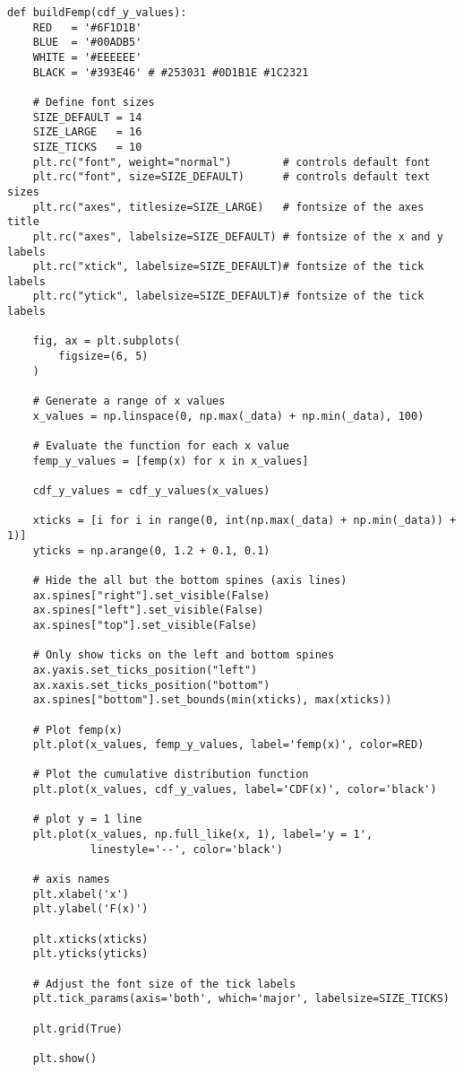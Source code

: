 \documentclass[a4paper, 14pt]{extarticle}
\begin{document}
\begin{lstlisting}
def buildFemp(cdf_y_values):
    RED   = '#6F1D1B'
    BLUE  = '#00ADB5'
    WHITE = '#EEEEEE'
    BLACK = '#393E46' # #253031 #0D1B1E #1C2321

    # Define font sizes
    SIZE_DEFAULT = 14
    SIZE_LARGE   = 16
    SIZE_TICKS   = 10
    plt.rc("font", weight="normal")        # controls default font
    plt.rc("font", size=SIZE_DEFAULT)      # controls default text sizes
    plt.rc("axes", titlesize=SIZE_LARGE)   # fontsize of the axes title
    plt.rc("axes", labelsize=SIZE_DEFAULT) # fontsize of the x and y labels
    plt.rc("xtick", labelsize=SIZE_DEFAULT)# fontsize of the tick labels
    plt.rc("ytick", labelsize=SIZE_DEFAULT)# fontsize of the tick labels

    fig, ax = plt.subplots(
        figsize=(6, 5)
    )

    # Generate a range of x values
    x_values = np.linspace(0, np.max(_data) + np.min(_data), 100)

    # Evaluate the function for each x value
    femp_y_values = [femp(x) for x in x_values]

    cdf_y_values = cdf_y_values(x_values)

    xticks = [i for i in range(0, int(np.max(_data) + np.min(_data)) + 1)]
    yticks = np.arange(0, 1.2 + 0.1, 0.1)

    # Hide the all but the bottom spines (axis lines)
    ax.spines["right"].set_visible(False)
    ax.spines["left"].set_visible(False)
    ax.spines["top"].set_visible(False)

    # Only show ticks on the left and bottom spines
    ax.yaxis.set_ticks_position("left")
    ax.xaxis.set_ticks_position("bottom")
    ax.spines["bottom"].set_bounds(min(xticks), max(xticks))

    # Plot femp(x)
    plt.plot(x_values, femp_y_values, label='femp(x)', color=RED)

    # Plot the cumulative distribution function
    plt.plot(x_values, cdf_y_values, label='CDF(x)', color='black')

    # plot y = 1 line
    plt.plot(x_values, np.full_like(x, 1), label='y = 1', 
             linestyle='--', color='black')

    # axis names
    plt.xlabel('x')
    plt.ylabel('F(x)')

    plt.xticks(xticks)
    plt.yticks(yticks)

    # Adjust the font size of the tick labels
    plt.tick_params(axis='both', which='major', labelsize=SIZE_TICKS)

    plt.grid(True)

    plt.show()
\end{lstlisting}
\end{document}
